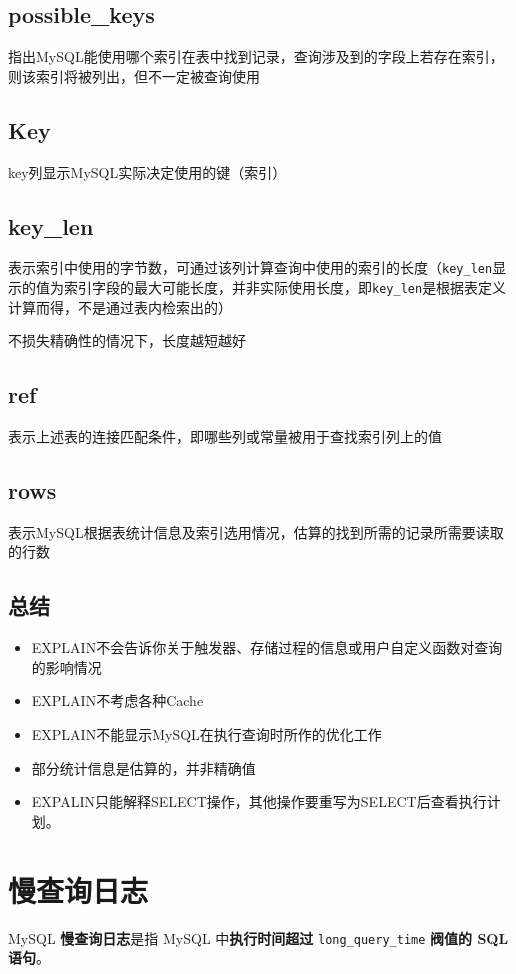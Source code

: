 \documentclass[UTF8,a4paper,12pt]{ctexbook}
\begin{document}
		\subsection{possible\_keys}
			指出MySQL能使用哪个索引在表中找到记录，查询涉及到的字段上若存在索引，则该索引将被列出，但不一定被查询使用
			
		\subsection{Key}
			key列显示MySQL实际决定使用的键（索引）
			
		\subsection{key\_len}
			表示索引中使用的字节数，可通过该列计算查询中使用的索引的长度（\verb|key_len|显示的值为索引字段的最大可能长度，并非实际使用长度，即\verb|key_len|是根据表定义计算而得，不是通过表内检索出的）
			
			不损失精确性的情况下，长度越短越好 
			
		\subsection{ref}
			表示上述表的连接匹配条件，即哪些列或常量被用于查找索引列上的值
			
		\subsection{rows}
			表示MySQL根据表统计信息及索引选用情况，估算的找到所需的记录所需要读取的行数
	
		\subsection{总结}
			\begin{itemize}
				\item EXPLAIN不会告诉你关于触发器、存储过程的信息或用户自定义函数对查询的影响情况
				\item EXPLAIN不考虑各种Cache
				\item EXPLAIN不能显示MySQL在执行查询时所作的优化工作
				\item 部分统计信息是估算的，并非精确值
				\item EXPALIN只能解释SELECT操作，其他操作要重写为SELECT后查看执行计划。
			\end{itemize}
			
	\section{慢查询日志}
		MySQL \textbf{慢查询日志}是指 MySQL 中\textbf{执行时间超过} \verb|long_query_time| \textbf{阀值的 SQL 语句}。
		
\end{document}
